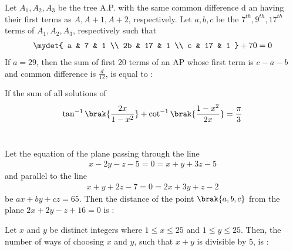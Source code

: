     \item Let $A_1, A_2, A_3$ be the tree A.P. with the same common difference d an having their 
        first terms as $A, A + 1, A + 2$, respectively. Let $a, b, c$ be the $7^{th}, 9^{th}, 17^{th}$
        terms of $A_1, A_2, A_3$, respectively such that 
        \begin{align}
            \mydet{
                a & 7 & 1 \\
                2b & 17 & 1 \\
                c & 17 & 1
            } + 70 = 0
        \end{align} If $a = 29$, then the sum of first 20 terms of an AP whose first term is 
        $c - a - b$ and common difference is $\frac{d}{12}$, is equal to :
        \hfill{}\\


    \item If the sum of all solutions of 
        \begin{align}
            \tan ^{-1} \brak{\frac{2x}{1 - x^2}} + \cot ^ {-1} \brak{\frac{1 - x^2}{2x}} = \frac{\pi}{3}
        \end{align}
        \hfill{}\\

    \item Let the equation of the plane passing through the line 
        \begin{align}
            x - 2y - z - 5 = 0 = x + y + 3z - 5
        \end{align} and parallel to the line
        \begin{align}
            x + y + 2z - 7 = 0 = 2x + 3y + z - 2
        \end{align} be $ax + by + cz = 65$. Then the distance of the point $\brak{a, b, c}$
        from the plane $2x + 2y - z + 16 = 0$ is :
        \hfill{}\\



    \item Let $x$ and $y$ be distinct integers where $1 \le x \le 25$ and $1 \le y \le 25$. Then, the
        number of ways of choosing $x$ and $y$, such that $x + y$ is divisible by 5, is :
        \hfill{}\\


